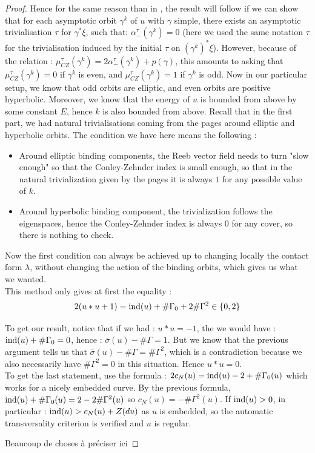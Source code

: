 \documentclass[../main.tex]{subfiles}
\begin{document}
\begin{proof}
Hence for the same reason than in \cite{SOBD2}, the result will follow if we can show that for each asymptotic orbit $\gamma^k$ of $u$ with $\gamma$ simple, there exists an asymptotic trivialisation $\tau$ for $\gamma^*\xi$, such that: $\alpha_-^\tau(\gamma^k) = 0$ (here we used the same notation $\tau$ for the trivialisation induced by the initial $\tau$ on $(\gamma^k)^*\xi$). However, because of the relation : $\mu_{CZ}^\tau(\gamma^k) = 2\alpha_-^\tau(\gamma^k) + p(\gamma)$, this amounts to asking that $\mu_{CZ}^\tau(\gamma^k) = 0$ if $\gamma ^k$ is even, and $\mu_{CZ}^{\tau}(\gamma^k) = 1$ if $\gamma^k$ is odd. Now in our particular setup, we know that odd orbits are elliptic, and even orbits are positive hyperbolic. Moreover, we know that the energy of $u$ is bounded from above by some constant $E$, hence $k$ is also bounded from above. Recall that in the first part, we had natural trivialisations coming from the pages around elliptic and hyperbolic orbits. The condition we have here means the following : 
\begin{itemize}
    \item Around elliptic binding components, the Reeb vector field needs to turn "slow enough" so that the Conley-Zehnder index is small enough, so that in the natural trivialization given by the pages it is always $1$ for any possible value of $k$.
    \item Around hyperbolic binding component, the trivialization follows the eigenspaces, hence the Conley-Zehnder index is always $0$ for any cover, so there is nothing to check.
\end{itemize}
Now the first condition can always be achieved up to changing locally the contact form $\lambda$, without changing the action of the binding orbits, which gives us what we wanted. \\
This method only gives at first the equality : 
$$2(u*u + 1) = \text{ind}(u) + \#\Gamma_0 + 2\#\Gamma^2\in\{0,2\}$$

To get our result, notice that if we had : $u*u = -1$, the we would have : $\text{ind}(u) + \#\Gamma_0 = 0 $, hence : $\overline{\sigma}(u) - \#\Gamma = 1$. But we know that the previous argument tells us that $\overline{\sigma}(u) - \#\Gamma = \#\Gamma^2$, which is a contradiction because we also necessarily have $\#\Gamma^2 = 0$ in this situation. Hence $u*u = 0$.\\

To get the last statement, use the formula : $2c_N(u) = \text{ind}(u) - 2 + \#\Gamma_0(u)$ which works for a nicely embedded curve. By the previous formula, $\text{ind}(u) + \#\Gamma_0(u) = 2 - 2\#\Gamma^2(u)$ so $c_N(u) = -\#\Gamma^2(u)$. If $\text{ind}(u) > 0$, in particular : $\text{ind}(u) > c_N(u) + Z(du)$ as $u$ is embedded, so the automatic transversality criterion is verified and $u$ is regular.

\color{red}Beaucoup de choses à préciser ici\color{black}
    
\end{proof}
\end{document}
